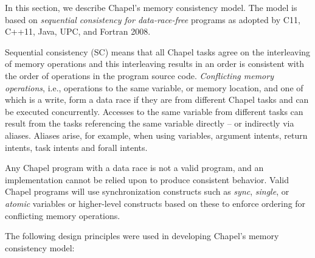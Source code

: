 \label{Memory_Consistency_Model}

In this section, we describe Chapel's memory consistency model. The
model is based on \emph{sequential consistency for data-race-free}
programs as adopted by C11, C++11, Java, UPC, and Fortran 2008.

Sequential consistency (SC) means that all Chapel tasks agree on the
interleaving of memory operations and this interleaving results in an
order is consistent with the order of operations in the program source
code.  \emph{Conflicting memory operations}, i.e., operations to the
same variable, or memory location, and one of which is a write, form a data race if they
are from different Chapel tasks and can be executed concurrently.
Accesses to the same variable from different tasks can result from
the tasks referencing the same variable directly -- or indirectly
via aliases. Aliases arise, for example, when using  variables,
argument intents, return intents, task intents and forall intents.

Any Chapel program with a data race is not a valid program, and an
implementation cannot be relied upon to produce consistent behavior.
Valid Chapel programs will use synchronization constructs such
as \emph{sync}, \emph{single}, or \emph{atomic} variables or
higher-level constructs based on these to enforce ordering for
conflicting memory operations.

The following design principles were used in developing Chapel's memory
consistency model:

